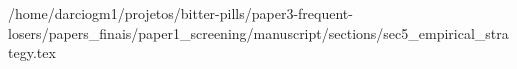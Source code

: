 /home/darciogm1/projetos/bitter-pills/paper3-frequent-losers/papers_finais/paper1_screening/manuscript/sections/sec5_empirical_strategy.tex